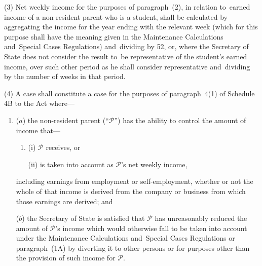 \documentclass[12pt,a4paper]{article}
\begin{document}
(3) Net weekly income for the purposes of paragraph~(2), in relation to~earned income of a non-resident parent who is a student, shall be calculated by aggregating the income for the year ending with the relevant week (which for this purpose shall have the meaning given in the Maintenance Calculations and~Special Cases Regulations) and~dividing by 52, or, where the Secretary of State does not consider the result to~be representative of the student’s earned income, over such other period as he shall consider representative and~dividing by the number of weeks in that period.

%

(4) A case shall constitute a case for the purposes of paragraph~4(1) of Schedule 4B to the Act where—
\begin{enumerate}\item[]
($a$) the non-resident parent (“$\mathcal{P}$”) has the ability to control the amount of income that—
\begin{enumerate}\item[]
(i) $\mathcal{P}$ receives, or

(ii) is taken into account as $\mathcal{P}$’s net weekly income,
\end{enumerate}
including earnings from employment or self-employment, whether or not the whole of that income is derived from the company or business from which those earnings are derived; and

($b$) the 
Secretary of State  %
is satisfied that $\mathcal{P}$ has unreasonably reduced the amount of $\mathcal{P}$’s income which would otherwise fall to be taken into account under the Maintenance Calculations and~Special Cases Regulations or paragraph~(1A) by diverting it to other persons or for purposes other than the provision of such income for $\mathcal{P}$.
\end{enumerate}
\end{document}
